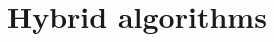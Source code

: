 \documentclass[10pt,letter]{article}
\begin{document}
\vfill
\clearpage %

\section{Hybrid algorithms}
\label{sec:hybrids}

\vfill
\clearpage %

\nocite{*}
\printbibheading[title={References}]
\printbibliography[heading=none]
\end{document}
